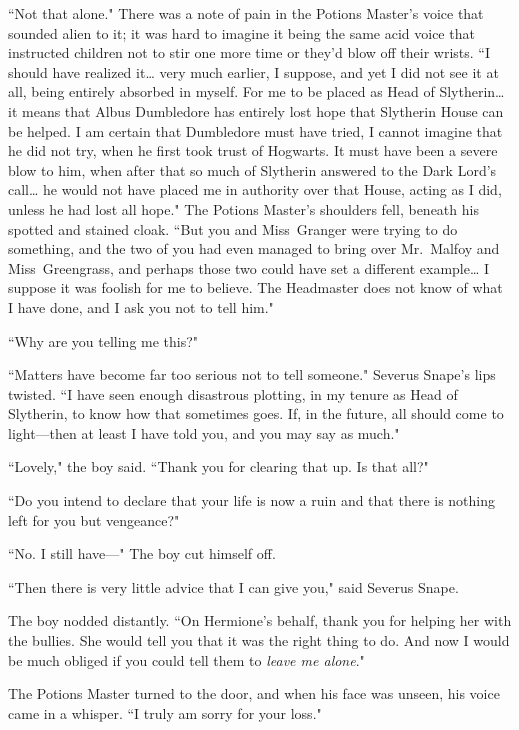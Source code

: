 ``Not that alone." There was a note of pain in the Potions Master's voice that sounded alien to it; it was hard to imagine it being the same acid voice that instructed children not to stir one more time or they'd blow off their wrists. ``I should have realized it{\ldots} very much earlier, I suppose, and yet I did not see it at all, being entirely absorbed in myself. For me to be placed as Head of Slytherin{\ldots} it means that Albus Dumbledore has entirely lost hope that Slytherin House can be helped. I am certain that Dumbledore must have tried, I cannot imagine that he did not try, when he first took trust of Hogwarts. It must have been a severe blow to him, when after that so much of Slytherin answered to the Dark Lord's call{\ldots} he would not have placed me in authority over that House, acting as I did, unless he had lost all hope." The Potions Master's shoulders fell, beneath his spotted and stained cloak. ``But you and Miss~Granger were trying to do something, and the two of you had even managed to bring over Mr.~Malfoy and Miss~Greengrass, and perhaps those two could have set a different example{\ldots} I suppose it was foolish for me to believe. The Headmaster does not know of what I have done, and I ask you not to tell him."

``Why are you telling me this?"

``Matters have become far too serious not to tell someone." Severus Snape's lips twisted. ``I have seen enough disastrous plotting, in my tenure as Head of Slytherin, to know how that sometimes goes. If, in the future, all should come to light—then at least I have told you, and you may say as much."

``Lovely," the boy said. ``Thank you for clearing that up. Is that all?"

``Do you intend to declare that your life is now a ruin and that there is nothing left for you but vengeance?"

``No. I still have—" The boy cut himself off.

``Then there is very little advice that I can give you," said Severus Snape.

The boy nodded distantly. ``On Hermione's behalf, thank you for helping her with the bullies. She would tell you that it was the right thing to do. And now I would be much obliged if you could tell them to \emph{leave me alone}."

The Potions Master turned to the door, and when his face was unseen, his voice came in a whisper. ``I truly am sorry for your loss."

